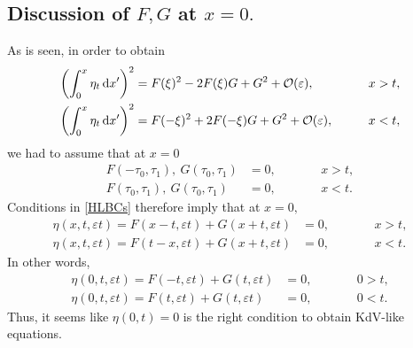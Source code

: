 \documentclass[10pt,reqno,oneside,a4paper, landscape]{article}
\begin{document}
\subsection{Discussion of $F, G$ at $x = 0.$}
As is seen, in order to obtain 
\begin{align*}
\left( \int^{x}_{0} \eta_t \,\mathrm{d} x' \right)^2 &= F(\xi)^2 - 2F(\xi)G + G^2 + \mathcal{O}(\varepsilon), &&\qquad x > t, \\
\left( \int^{x}_{0} \eta_t \,\mathrm{d} x' \right)^2 &= F(-\xi)^2 + 2F(-\xi)G + G^2 + \mathcal{O}(\varepsilon), &&\qquad x < t,
\end{align*}
we had to assume that at $x = 0$
\begin{equation}\label{HLBCs}
\begin{aligned}
F(-\tau_0, \tau_1), ~ G(\tau_0, \tau_1) &= 0, &&\qquad x > t, \\
F(\tau_0, \tau_1), ~ G(\tau_0, \tau_1) &= 0, &&\qquad x < t.
\end{aligned}
\end{equation}
Conditions in \eqref{HLBCs} therefore imply that at $x=0,$
\begin{equation*}
\begin{aligned}
\eta(x, t, \varepsilon t) = F(x-t, \varepsilon t)+ G(x+t, \varepsilon t) &= 0, &&\qquad x > t, \\
\eta(x, t, \varepsilon t) = F(t-x, \varepsilon t) + G(x+t, \varepsilon t) &= 0, &&\qquad x < t.
\end{aligned}
\end{equation*}
In other words, 
\begin{equation*}
\begin{aligned}
\eta(0, t, \varepsilon t) = F(-t, \varepsilon t)+ G(t, \varepsilon t) &= 0, &&\qquad 0 > t, \\
\eta(0, t, \varepsilon t) = F(t, \varepsilon t) + G(t, \varepsilon t) &= 0, &&\qquad 0 < t.
\end{aligned}
\end{equation*}
Thus, it seems like $\eta(0,t) = 0$ is the right condition to obtain KdV-like equations.
{\small}
\end{document}
